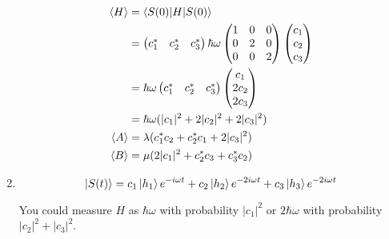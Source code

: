 \documentclass{article}
\begin{document}
\begin{enumerate}
        \begin{align*}
          \braket{H} & = \braket{S(0) | H | S(0)}                                \\
                     & = \begin{pmatrix}
                           c_1^* & c_2^* & c_3^*
                         \end{pmatrix} \hbar \omega \begin{pmatrix}
                                                      1 & 0 & 0 \\
                                                      0 & 2 & 0 \\
                                                      0 & 0 & 2
                                                    \end{pmatrix} \begin{pmatrix}
                                                                    c_1 \\
                                                                    c_2 \\
                                                                    c_3
                                                                  \end{pmatrix} \\
                     & = \hbar \omega \begin{pmatrix}
                                        c_1^* & c_2^* & c_3^*
                                      \end{pmatrix} \begin{pmatrix}
                                                      c_1   \\
                                                      2 c_2 \\
                                                      2 c_3
                                                    \end{pmatrix}               \\
                     & = \hbar \omega (|c_1|^2 + 2 |c_2|^2 + 2 |c_3|^2)          \\
          \braket{A} & = \lambda (c_1^* c_2 + c_2^* c_1 + 2 |c_3|^2)             \\
          \braket{B} & = \mu (2 |c_1|^2 + c_2^* c_3 + c_3^* c_2)
        \end{align*}

  \item

        \[\ket{S(t)} = c_1 \ket{h_1} e^{-i \omega t} + c_2 \ket{h_2} e^{-2 i \omega t} + c_3 \ket{h_3} e^{-2 i \omega t}\]

        You could measure $H$ as $\hbar \omega$ with probability $|c_1|^2$ or $2 \hbar \omega$ with probability $|c_2|^2 + |c_3|^2$.
\end{enumerate}
\end{document}
